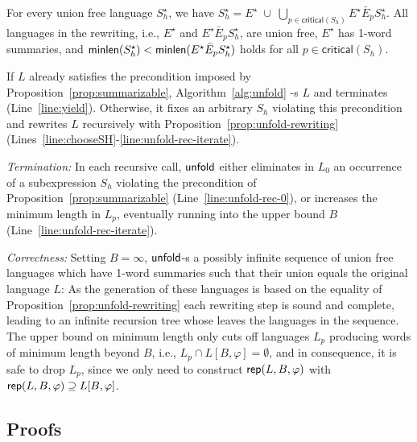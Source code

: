 \documentclass[envcountsame]{llncs}
\newcommand{\representation}{\ensuremath{{\sf rep}}\xspace}
\newcommand{\unfold}{\ensuremath{{\sf unfold}}\xspace}
\newcommand{\minlength}{\ensuremath{{\sf minlen}}\xspace}
\newcommand{\criticalpos}{\ensuremath{\mathsf{critical}}\xspace}
\begin{document}
\begin{proposition}
  \label{prop:unfold-rewriting}
  For every union free language $S_h^\star$, we have $S_h^\star=
  E^\star\; \cup \; \bigcup_{p\in \criticalpos(S_h)} E^\star\bar E_p
  S_h^\star$. All languages in the rewriting, i.e., $E^\star$ and
  $E^\star\bar E_p S_h^\star$, are union free, $E^\star$ has 1-word
  summaries, and $\minlength(S_h^\star)<\minlength(E^\star\bar E_p
  S_h^\star)$ holds for all $p\in\criticalpos(S_h)$.
\end{proposition}


If $L$ already satisfies the precondition imposed by
Proposition~\ref{prop:summarizable}, Algorithm~\ref{alg:unfold}
\Yield-s $L$ and terminates (Line~\ref{line:yield}).
Otherwise, it fixes an arbitrary $S_h$ violating this precondition and
rewrites $L$ recursively with Proposition~\ref{prop:unfold-rewriting}
(Lines~\ref{line:chooseSH}-\ref{line:unfold-rec-iterate}).
\begin{inparaenum}[\bfseries(1)]
\item \emph{Termination:} In each recursive call, \unfold either
  eliminates in $L_0$ an occurrence of a subexpression $S_h$ violating
  the precondition of Proposition~\ref{prop:summarizable}
  (Line~\ref{line:unfold-rec-0}), or increases the minimum length in
  $L_p$, eventually running into the upper bound $B$
  (Line~\ref{line:unfold-rec-iterate}).
\item \emph{Correctness:} Setting $B=\infty$, \unfold \Yield-s a
  possibly infinite sequence of union free languages which have 1-word
  summaries such that their union equals the original language $L$:
As the generation of these languages is based on the equality of
  Proposition~\ref{prop:unfold-rewriting} each rewriting step is sound
  and complete, leading to an infinite recursion tree whose leaves
  \Yield the languages in the sequence.
The upper bound on minimum length only cuts off languages $L_p$
  producing words of minimum length beyond $B$, i.e., $L_p\cap
  L[B,\varphi]=\emptyset$, and in consequence, it is safe to drop
  $L_p$, since we only need to construct
  $\representation(L,B,\varphi)$ with
  $\representation(L,B,\varphi)\supseteq L[B,\varphi]$.
\end{inparaenum}

 \subsection{Proofs}
\label{sec:decision-proofs}
\end{document}
